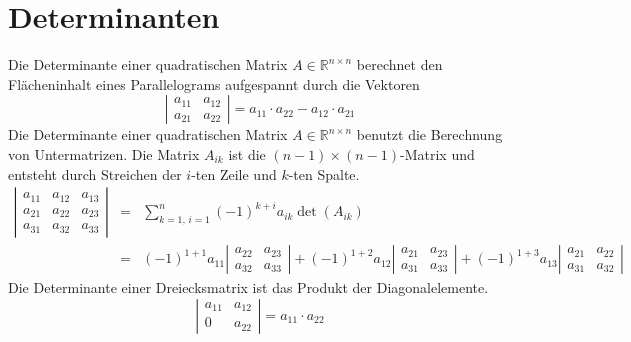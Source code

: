 \section{Determinanten}
Die Determinante einer quadratischen Matrix $A\in \mathbb{R}^{n\times n}$ berechnet den Flächeninhalt eines Parallelograms aufgespannt durch die Vektoren
\begin{equation} 
\boxed{\left\vert\begin{matrix}a_{11}&a_{12}\\a_{21}&a_{22}\end{matrix}\right\vert=a_{11}\cdot a_{22}-a_{12}\cdot a_{21}}
\end{equation} 
Die Determinante einer quadratischen Matrix $A\in \mathbb{R}^{n\times n}$ benutzt die Berechnung von Untermatrizen. Die Matrix $A_{ik}$ ist die $\left(n-1\right)\times\left(n-1\right)$-Matrix und entsteht durch Streichen der $i$-ten Zeile und $k$-ten Spalte.  
\begin{equation}
\boxed{\begin{array}{lll}
\left\vert\begin{matrix}a_{11}&a_{12}&a_{13}\\a_{21}&a_{22}&a_{23}\\a_{31}&a_{32}&a_{33}\end{matrix}\right\vert&=&\displaystyle \sum_{k=1,\,i=1}^n\left(-1\right)^{k+i}a_{ik}\det\left(A_{ik}\right)\\
&=&\left(-1\right)^{1+1}a_{11}\left\vert\begin{matrix}a_{22}&a_{23}\\a_{32}&a_{33}\end{matrix}\right\vert+\left(-1\right)^{1+2}a_{12}\left\vert\begin{matrix}a_{21}&a_{23}\\a_{31}&a_{33}\end{matrix}\right\vert+\left(-1\right)^{1+3}a_{13}\left\vert\begin{matrix}a_{21}&a_{22}\\a_{31}&a_{32}\end{matrix}\right\vert
\end{array}} 
\end{equation}
Die Determinante einer Dreiecksmatrix ist das Produkt der Diagonalelemente.
\begin{equation}
\boxed{\left\vert\begin{matrix}a_{11}&a_{12}\\0&a_{22}\end{matrix}\right\vert=a_{11}\cdot a_{22}}
\end{equation}
